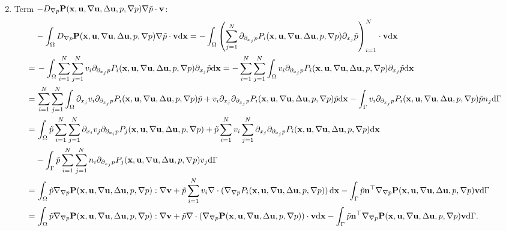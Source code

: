 \documentclass[oneside]{book}
\numberwithin{equation}{section}
\begin{document}
\begin{enumerate}[leftmargin=0in]
\begin{align*}
    \end{align*}
    \item Term $-D_{\nabla p}{\bf P}({\bf x},{\bf u},\nabla{\bf u},\Delta{\bf u},p,\nabla p)\nabla\tilde{p}\cdot{\bf v}$:
    \begin{align*}
        &-\int_\Omega D_{\nabla p}{\bf P}({\bf x},{\bf u},\nabla{\bf u},\Delta{\bf u},p,\nabla p)\nabla\tilde{p}\cdot{\bf v}{\rm d}{\bf x} = -\int_\Omega \left(\sum_{j=1}^N \partial_{\partial_{x_j}p}P_i({\bf x},{\bf u},\nabla{\bf u},\Delta{\bf u},p,\nabla p)\partial_{x_j}\tilde{p}\right)_{i=1}^N\cdot{\bf v}{\rm d}{\bf x}\\
        =&\, - \int_\Omega \sum_{i=1}^N\sum_{j=1}^N v_i\partial_{\partial_{x_j}p}P_i({\bf x},{\bf u},\nabla{\bf u},\Delta{\bf u},p,\nabla p)\partial_{x_j}\tilde{p}{\rm d}{\bf x} = - \sum_{i=1}^N\sum_{j=1}^N \int_\Omega v_i\partial_{\partial_{x_j}p}P_i({\bf x},{\bf u},\nabla{\bf u},\Delta{\bf u},p,\nabla p)\partial_{x_j}\tilde{p}{\rm d}{\bf x}\\
        =&\, \sum_{i=1}^N\sum_{j=1}^N \int_\Omega \partial_{x_j}v_i\partial_{\partial_{x_j}p}P_i({\bf x},{\bf u},\nabla{\bf u},\Delta{\bf u},p,\nabla p)\tilde{p} + v_i\partial_{x_j}\partial_{\partial_{x_j}p}P_i({\bf x},{\bf u},\nabla{\bf u},\Delta{\bf u},p,\nabla p)\tilde{p}{\rm d}{\bf x} - \int_\Gamma v_i\partial_{\partial_{x_j}p}P_i({\bf x},{\bf u},\nabla{\bf u},\Delta{\bf u},p,\nabla p)\tilde{p}n_j{\rm d}\Gamma\\
        =&\, \int_\Omega \tilde{p}\sum_{i=1}^N\sum_{j=1}^N \partial_{x_i}v_j\partial_{\partial_{x_i}p}P_j({\bf x},{\bf u},\nabla{\bf u},\Delta{\bf u},p,\nabla p) + \tilde{p}\sum_{i=1}^N v_i\sum_{j=1}^N \partial_{x_j}\partial_{\partial_{x_j}p}P_i({\bf x},{\bf u},\nabla{\bf u},\Delta{\bf u},p,\nabla p){\rm d}{\bf x}\\
        &- \int_\Gamma \tilde{p}\sum_{i=1}^N\sum_{j=1}^N n_i\partial_{\partial_{x_j}p}P_j({\bf x},{\bf u},\nabla{\bf u},\Delta{\bf u},p,\nabla p)v_j{\rm d}\Gamma\\
        =&\, \int_\Omega \tilde{p}\nabla_{\nabla p}{\bf P}({\bf x},{\bf u},\nabla{\bf u},\Delta{\bf u},p,\nabla p):\nabla{\bf v} + \tilde{p}\sum_{i=1}^N v_i\nabla\cdot\left(\nabla_{\nabla p}P_i({\bf x},{\bf u},\nabla{\bf u},\Delta{\bf u},p,\nabla p)\right){\rm d}{\bf x} - \int_\Gamma \tilde{p}{\bf n}^\top\nabla_{\nabla p}{\bf P}({\bf x},{\bf u},\nabla{\bf u},\Delta{\bf u},p,\nabla p){\bf v}{\rm d}\Gamma\\
        =&\, \int_\Omega \tilde{p}\nabla_{\nabla p}{\bf P}({\bf x},{\bf u},\nabla{\bf u},\Delta{\bf u},p,\nabla p):\nabla{\bf v} + \tilde{p}\nabla\cdot\left(\nabla_{\nabla p}{\bf P}({\bf x},{\bf u},\nabla{\bf u},\Delta{\bf u},p,\nabla p)\right)\cdot{\bf v}{\rm d}{\bf x} - \int_\Gamma \tilde{p}{\bf n}^\top\nabla_{\nabla p}{\bf P}({\bf x},{\bf u},\nabla{\bf u},\Delta{\bf u},p,\nabla p){\bf v}{\rm d}\Gamma.

\end{align*}
\end{enumerate}
\end{document}
